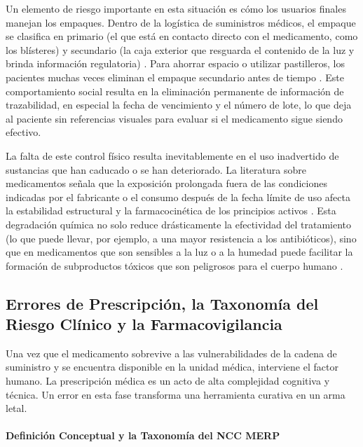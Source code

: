 Un elemento de riesgo importante en esta situación es cómo los usuarios finales manejan los empaques. Dentro de la logística de suministros médicos, el empaque se clasifica en primario (el que está en contacto directo con el medicamento, como los blísteres) y secundario (la caja exterior que resguarda el contenido de la luz y brinda información regulatoria) \cite{empaque_secundario_2023}. Para ahorrar espacio o utilizar pastilleros, los pacientes muchas veces eliminan el empaque secundario antes de tiempo \cite{empaque_secundario_2023}. Este comportamiento social resulta en la eliminación permanente de información de trazabilidad, en especial la fecha de vencimiento y el número de lote, lo que deja al paciente sin referencias visuales para evaluar si el medicamento sigue siendo efectivo.

La falta de este control físico resulta inevitablemente en el uso inadvertido de sustancias que han caducado o se han deteriorado. La literatura sobre medicamentos señala que la exposición prolongada fuera de las condiciones indicadas por el fabricante o el consumo después de la fecha límite de uso afecta la estabilidad estructural y la farmacocinética de los principios activos \cite{degradacion_farmacologica_2024}. Esta degradación química no solo reduce drásticamente la efectividad del tratamiento (lo que puede llevar, por ejemplo, a una mayor resistencia a los antibióticos), sino que en medicamentos que son sensibles a la luz o a la humedad puede facilitar la formación de subproductos tóxicos que son peligrosos para el cuerpo humano \cite{degradacion_farmacologica_2024}.

\subsection{Errores de Prescripción, la Taxonomía del Riesgo Clínico y la Farmacovigilancia}

Una vez que el medicamento sobrevive a las vulnerabilidades de la cadena de suministro y se encuentra disponible en la unidad médica, interviene el factor humano. La prescripción médica es un acto de alta complejidad cognitiva y técnica. Un error en esta fase transforma una herramienta curativa en un arma letal.

\paragraph{Definición Conceptual y la Taxonomía del NCC MERP}\leavevmode \\

